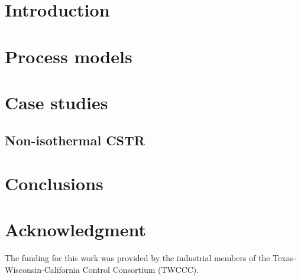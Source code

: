 \documentclass[preprint,5p, twocolumn, authoryear]{elsarticle}
\begin{document}
\section{Introduction} \label{sec:introduction}


\section{Process models} \label{sec:process_models}


\section{Case studies} \label{sec:case_study}

\subsection{Non-isothermal CSTR}

\section{Conclusions} \label{sec:conclusions}


\section*{Acknowledgment}
The funding for this work was provided by the industrial members of the
Texas-Wisconsin-California Control Consortium (TWCCC). 



\end{document}
